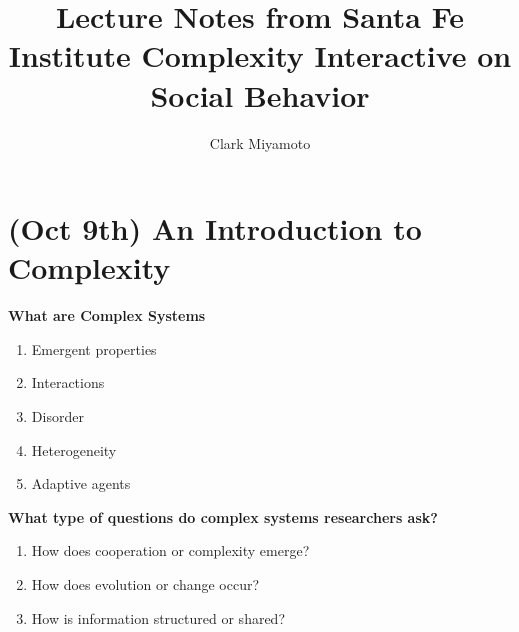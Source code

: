 \documentclass{report}
\title{Lecture Notes from Santa Fe Institute Complexity Interactive on Social Behavior}
\author{Clark Miyamoto}
\date{}
\begin{document}
\maketitle

\tableofcontents

\newpage

\chapter{(Oct 9th) An Introduction to Complexity}

\textbf{What are Complex Systems}
  
\begin{enumerate}
	\item Emergent properties
	\item Interactions
	\item Disorder
	\item Heterogeneity
	\item Adaptive agents
\end{enumerate}

\textbf{What type of questions do complex systems researchers ask?}
\begin{enumerate}
	\item How does cooperation or complexity emerge?
	\item How does evolution or change occur?
	\item How is information structured or shared?
\end{enumerate}
\end{document}
